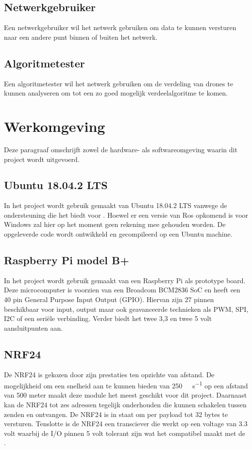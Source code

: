 \documentclass[a4paper, 11pt, oneside]{report}
\begin{document}
\subsection{Netwerkgebruiker}
\label{inleiding:gebruikers:netwerkgebruiker}
Een netwerkgebruiker wil het netwerk gebruiken om data te kunnen versturen naar een andere punt binnen of buiten het netwerk. 

\subsection{Algoritmetester}
\label{inleiding:gebruikers:algoritmetester}
Een algoritmetester wil het netwerk gebruiken om de verdeling van drones te kunnen analyseren om tot een zo goed mogelijk verdeelalgoritme te komen.

\section{Werkomgeving}
\label{inleiding:werkomgeving}
Deze paragraaf omschrijft zowel de hardware- als softwareomgeving waarin dit project wordt uitgevoerd. 

\subsection{Ubuntu 18.04.2 LTS}
\label{inleiding:werkomgeving:ubuntu}
In het project wordt gebruik gemaakt van Ubuntu 18.04.2 LTS vanwege de ondersteuning die het biedt voor .
Hoewel er een versie van Ros opkomend is voor Windows zal hier op het moment geen rekening mee gehouden worden.
De opgeleverde code wordt ontwikkeld en gecompileerd op een Ubuntu machine.


\subsection{Raspberry Pi model B+}
\label{inleiding:werkomgeving:raspberrypi}

In het project wordt gebruik gemaakt van een Raspberry Pi als prototype board.
Deze microcomputer is voorzien van een Broadcom BCM2836 SoC en heeft een 40 pin General Purpose Input Output (GPIO).
Hiervan zijn 27 pinnen beschikbaar voor input, output maar ook geavanceerde technieken als PWM, SPI, I2C  of een seriële verbinding.
Verder biedt het twee 3,3 en twee 5 volt aansluitpunten aan.


\subsection{NRF24}
\label{inleiding:werkomgeving:nrf24}
De NRF24 is gekozen door zijn prestaties ten opzichte van afstand.
De mogelijkheid om een snelheid aan te kunnen bieden van \SI{250}{\kilo\bit\per\second} op een afstand van 500 meter maakt deze module het meest geschikt voor dit project.
Daarnaast kan de NRF24 tot zes adressen tegelijk onderhouden die kunnen schakelen tussen zenden en ontvangen.
De NRF24 is in staat om per payload tot 32 bytes te versturen. 
Tenslotte is de NRF24 een transciever die werkt op een voltage van 3.3 volt waarbij de I/O pinnen 5 volt tolerant zijn wat het compatibel maakt met de .
\end{document}
